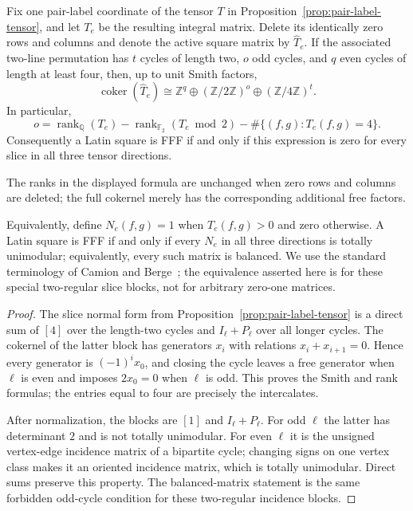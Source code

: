 \begin{theorem}
\label{thm:pair-tensor-smith}
Fix one pair-label coordinate of the tensor $T$ in
Proposition~\ref{prop:pair-label-tensor}, and let $T_e$ be the resulting
integral matrix.  Delete its identically zero rows and columns and denote the
active square matrix by $\widehat T_e$.  If the associated two-line
permutation has $t$ cycles of
length two, $o$ odd cycles, and $q$ even cycles of length at least four, then,
up to unit Smith factors,
\[
 \operatorname{coker}(\widehat T_e)\cong
 \mathbb Z^q\oplus(\mathbb Z/2\mathbb Z)^o
 \oplus(\mathbb Z/4\mathbb Z)^t.
\]
In particular,
\[
 o=\operatorname{rank}_{\mathbb Q}(T_e)
   -\operatorname{rank}_{\mathbb F_2}(T_e\bmod2)
   -\#\{(f,g):T_e(f,g)=4\}.
\]
Consequently a Latin square is FFF if and only if this expression is zero for
every slice in all three tensor directions.

The ranks in the displayed formula are unchanged when zero rows and columns
are deleted; the full cokernel merely has the corresponding additional free
factors.

Equivalently, define $N_e(f,g)=1$ when $T_e(f,g)>0$ and zero otherwise.  A
Latin square is FFF if and only if every $N_e$ in all three directions is
totally unimodular; equivalently, every such matrix is balanced.  We use the
standard terminology of Camion and Berge~\cite{Camion1965,Berge1972}; the
equivalence asserted here is for these special two-regular slice blocks, not
for arbitrary zero-one matrices.
\end{theorem}

\begin{proof}
The slice normal form from Proposition~\ref{prop:pair-label-tensor} is a
direct sum of $[4]$ over the length-two cycles and
$I_\ell+P_\ell$ over all longer cycles.  The cokernel of the latter block has
generators $x_i$ with relations $x_i+x_{i+1}=0$.  Hence every generator is
$(-1)^ix_0$, and closing the cycle leaves a free generator when $\ell$ is
even and imposes $2x_0=0$ when $\ell$ is odd.  This proves the Smith and rank
formulas; the entries equal to four are precisely the intercalates.

After normalization, the blocks are $[1]$ and $I_\ell+P_\ell$.  For odd
$\ell$ the latter has determinant $2$ and is not totally unimodular.  For
even $\ell$ it is the unsigned vertex-edge incidence matrix of a bipartite
cycle; changing signs on one vertex class makes it an oriented incidence
matrix, which is totally unimodular.  Direct sums preserve this property.
The balanced-matrix statement is the same forbidden odd-cycle condition for
these two-regular incidence blocks.
\end{proof}

